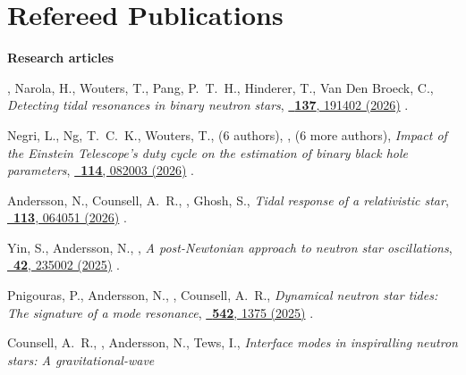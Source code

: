 

\section{Refereed Publications}

\textbf{Research articles}

\begin{publist}
    \item \fgittins, Narola, H., \advisedStudent{}Wouters, T., Pang, P.~T.~H.,
    Hinderer, T., Van Den Broeck, C.,
    \textit{Detecting tidal resonances in binary neutron stars},
    \href{https://doi.org/10.1103/51xv-gfy9}%
    {\prl\ \textbf{137}, 191402 (2026)}
    .
    \item Negri, L., Ng, T.~C.~K., \advisedStudent{}Wouters, T., (6 authors),
    \fgittins, (6 more authors),
    \textit{Impact of the Einstein Telescope's duty cycle on the estimation of
    binary black hole parameters},
    \href{https://doi.org/10.1103/1zg7-sd8v}%
    {\prd\ \textbf{114}, 082003 (2026)}
    .
    \item Andersson, N., \advisedStudent{}Counsell, A.~R., \fgittins, Ghosh, S.,
    \textit{Tidal response of a relativistic star},
    \href{https://doi.org/10.1103/x4yr-x1c4}%
    {\prd\ \textbf{113}, 064051 (2026)}
    .
    \item \advisedStudent{}Yin, S., Andersson, N., \fgittins,
    \textit{A post-Newtonian approach to neutron star oscillations},
    \href{https://doi.org/10.1088/1361-6382/ae1c16}%
    {\cqg\ \textbf{42}, 235002 (2025)}
    .
    \item Pnigouras, P., Andersson, N., \fgittins, \advisedStudent{}Counsell, A.~R.,
    \textit{Dynamical neutron star tides: The signature of a mode resonance},
    \href{https://doi.org/10.1093/mnras/staf1285}%
    {\mnras\ \textbf{542}, 1375 (2025)}
    .
    \item \advisedStudent{}Counsell, A.~R., \fgittins, Andersson, N., Tews, I.,
    \textit{Interface modes in inspiralling neutron stars: A gravitational-wave
}
\end{publist}
